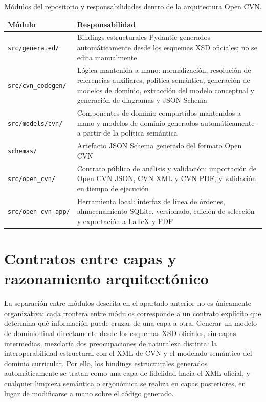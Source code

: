 \begin{table}[htbp]
  \centering
  \small
  \renewcommand{\arraystretch}{1.2}
  \begin{tabular}{p{} p{}}
    \hline
    \textbf{Módulo} & \textbf{Responsabilidad} \\
    \hline
    \texttt{src/generated/} & Bindings estructurales Pydantic generados automáticamente desde los esquemas XSD oficiales; no se edita manualmente \\
    \texttt{src/cvn\_codegen/} & Lógica mantenida a mano: normalización, resolución de referencias auxiliares, política semántica, generación de modelos de dominio, extracción del modelo conceptual y generación de diagramas y JSON Schema \\
    \texttt{src/models/cvn/} & Componentes de dominio compartidos mantenidos a mano y modelos de dominio generados automáticamente a partir de la política semántica \\
    \texttt{schemas/} & Artefacto JSON Schema generado del formato Open CVN \\
    \texttt{src/open\_cvn/} & Contrato público de análisis y validación: importación de Open CVN JSON, CVN XML y CVN PDF, y validación en tiempo de ejecución \\
    \texttt{src/open\_cvn\_app/} & Herramienta local: interfaz de línea de órdenes, almacenamiento SQLite, versionado, edición de selección y exportación a LaTeX y PDF \\
    \hline
  \end{tabular}
  \caption{Módulos del repositorio y responsabilidades dentro de la arquitectura Open CVN.}
  \label{tab:metodologia_modulos}
\end{table}

\section{Contratos entre capas y razonamiento arquitectónico}
\label{sec:metodologia_contratos}

La separación entre módulos descrita en el apartado anterior no es únicamente
organizativa: cada frontera entre módulos corresponde a un contrato explícito
que determina qué información puede cruzar de una capa a otra. Generar un
modelo de dominio final directamente desde los esquemas XSD oficiales, sin
capas intermedias, mezclaría dos preocupaciones de naturaleza distinta: la
interoperabilidad estructural con el XML de CVN y el modelado semántico del
dominio curricular. Por ello, los bindings estructurales generados
automáticamente se tratan como una capa de fidelidad hacia el XML oficial, y
cualquier limpieza semántica o ergonómica se realiza en capas posteriores, en
lugar de modificarse a mano sobre el código generado.

